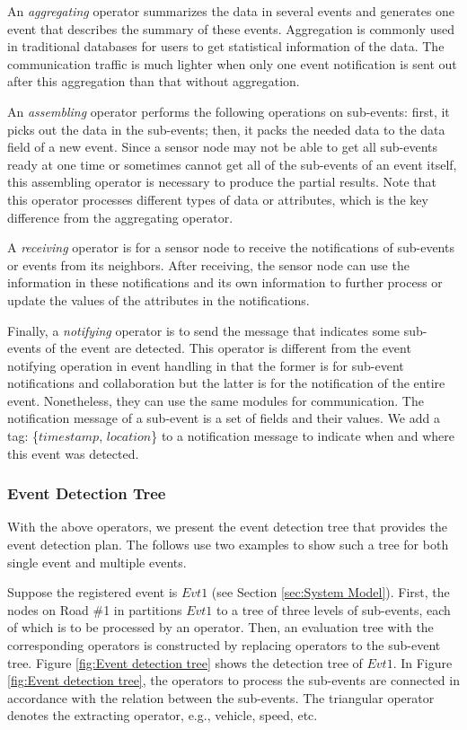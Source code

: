 \documentclass[12pt,journal,draftcls,letterpaper,onecolumn]{elsarticle}
\begin{document}
An \emph{aggregating} operator summarizes the data in several events
and generates one event that describes the summary of these events.
Aggregation is commonly used in traditional databases for users to
get statistical information of the data. The communication traffic
is much lighter when only one event notification is sent out after
this aggregation than that without aggregation.

An \emph{assembling} operator performs the following operations on
sub-events: first, it picks out the data in the sub-events; then, it
packs the needed data to the data field of a new event. Since a
sensor node may not be able to get all sub-events ready at one time
or sometimes cannot get all of the sub-events of an event itself,
this assembling operator is necessary to produce the partial
results. Note that this operator
 processes different types of data or attributes, which is the
key difference from the aggregating operator.

A \emph{receiving} operator is for a sensor node to receive the
notifications of sub-events or events from its neighbors. After
receiving, the sensor node can use the information in these
notifications and its own information to further process or update
the values of the attributes in the notifications.

Finally, a \emph{notifying} operator is to send the message that
indicates some sub-events of the event are detected. This operator
is different from the event notifying operation in event handling in
that the former is for sub-event notifications and collaboration but
the latter is for the notification of the entire event. Nonetheless,
they can use the same modules for communication. The notification
message of a sub-event is a set of fields and their values. We add a
tag: \{$timestamp$, $location$\} to a notification message to
indicate when and where this event was detected.


\subsubsection{Event Detection Tree}

With the above operators, we present the event detection tree that
provides the event detection plan. The follows use two examples to
show such a tree for both single event and multiple events.

Suppose the registered event is $Evt1$ (see Section \ref{sec:System
Model}). First, the nodes on Road \#1 in partitions $Evt1$ to a tree
of three levels of sub-events, each of which is to be processed by
an operator. Then, an evaluation tree with the corresponding
operators is constructed by replacing operators to the sub-event
tree. Figure \ref{fig:Event detection tree} shows the detection tree
of $Evt1$. In Figure \ref{fig:Event detection tree}, the operators
to process the sub-events are connected in accordance with the
relation between the sub-events. The triangular operator denotes the
extracting operator, e.g., vehicle, speed, etc.
\end{document}
